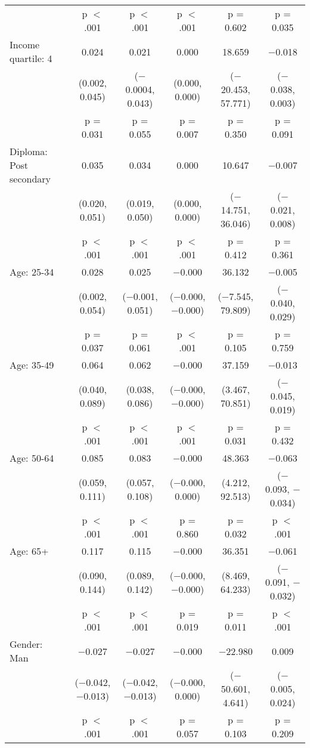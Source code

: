 \begin{tabular}{@{\extracolsep{5pt}}lccccc}
  & p $<$ .001 & p $<$ .001 & p $<$ .001 & p = 0.602 & p = 0.035 \\ 
  Income quartile: 4 & 0.024 & 0.021 & 0.000 & 18.659 & $-$0.018 \\ 
  & (0.002, 0.045) & ($-$0.0004, 0.043) & (0.000, 0.000) & ($-$20.453, 57.771) & ($-$0.038, 0.003) \\ 
  & p = 0.031 & p = 0.055 & p = 0.007 & p = 0.350 & p = 0.091 \\ 
  Diploma: Post secondary & 0.035 & 0.034 & 0.000 & 10.647 & $-$0.007 \\ 
  & (0.020, 0.051) & (0.019, 0.050) & (0.000, 0.000) & ($-$14.751, 36.046) & ($-$0.021, 0.008) \\ 
  & p $<$ .001 & p $<$ .001 & p $<$ .001 & p = 0.412 & p = 0.361 \\ 
  Age: 25\mbox{-}34 & 0.028 & 0.025 & $-$0.000 & 36.132 & $-$0.005 \\ 
  & (0.002, 0.054) & ($-$0.001, 0.051) & ($-$0.000, $-$0.000) & ($-$7.545, 79.809) & ($-$0.040, 0.029) \\ 
  & p = 0.037 & p = 0.061 & p $<$ .001 & p = 0.105 & p = 0.759 \\ 
  Age: 35\mbox{-}49 & 0.064 & 0.062 & $-$0.000 & 37.159 & $-$0.013 \\ 
  & (0.040, 0.089) & (0.038, 0.086) & ($-$0.000, $-$0.000) & (3.467, 70.851) & ($-$0.045, 0.019) \\ 
  & p $<$ .001 & p $<$ .001 & p $<$ .001 & p = 0.031 & p = 0.432 \\ 
  Age: 50\mbox{-}64 & 0.085 & 0.083 & $-$0.000 & 48.363 & $-$0.063 \\ 
  & (0.059, 0.111) & (0.057, 0.108) & ($-$0.000, 0.000) & (4.212, 92.513) & ($-$0.093, $-$0.034) \\ 
  & p $<$ .001 & p $<$ .001 & p = 0.860 & p = 0.032 & p $<$ .001 \\ 
  Age: 65+ & 0.117 & 0.115 & $-$0.000 & 36.351 & $-$0.061 \\ 
  & (0.090, 0.144) & (0.089, 0.142) & ($-$0.000, $-$0.000) & (8.469, 64.233) & ($-$0.091, $-$0.032) \\ 
  & p $<$ .001 & p $<$ .001 & p = 0.019 & p = 0.011 & p $<$ .001 \\ 
  Gender: Man & $-$0.027 & $-$0.027 & $-$0.000 & $-$22.980 & 0.009 \\ 
  & ($-$0.042, $-$0.013) & ($-$0.042, $-$0.013) & ($-$0.000, 0.000) & ($-$50.601, 4.641) & ($-$0.005, 0.024) \\ 
  & p $<$ .001 & p $<$ .001 & p = 0.057 & p = 0.103 & p = 0.209 \\ 

\end{tabular}
